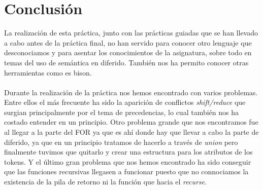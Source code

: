 \documentclass[11pt,spanish]{article}
\begin{document}
	\section{Conclusión}
	La realización de esta práctica, junto con las prácticas guiadas que se han llevado a cabo antes de la práctica final, no han servido para conocer otro lenguaje que desconociamos y para asentar los conocimientos de la asignatura, sobre todo en temas del uso de semántica en diferido. También nos ha permito conocer otras herramientas como es bison.\\ \\
	Durante la realización de la práctica nos hemos encontrado con varios problemas. Entre ellos el más frecuente ha sido la aparición de conflictos \textit {shift/reduce} que surgian principalmente por el tema de precedencias, lo cual también nos ha costado entender en un principio. Otro problema grande que nos encontramos fue al llegar a la parte del FOR ya que es ahí donde hay que llevar a cabo la parte de diferido, ya que en un principio tratamos de hacerlo a través de \textit {union} pero finalmente tuvimos que quitarlo y crear una estructura para los atributos de los tokens. Y el último gran problema que nos hemos encontrado ha sido conseguir que las funciones recursivas llegasen a funcionar puesto que no connociamos la existencia de la pila de retorno ni la función que hacia el \textit {recurse}.
	
\end{document}
